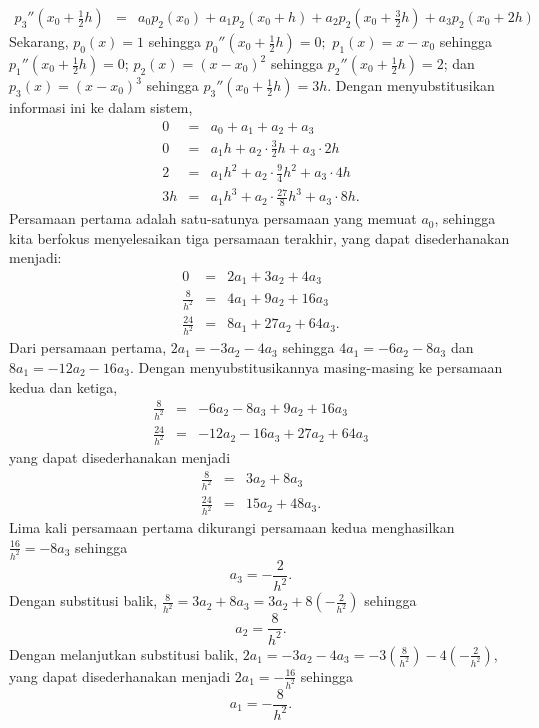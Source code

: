 \begin{description}
\begin{eqnarray*}
p_{3}''\left(x_{0}+\frac{1}{2}h\right) & = & a_{0}p_{2}(x_{0})+a_{1}p_{2}(x_{0}+h)+a_{2}p_{2}(x_{0}+\frac{3}{2}h)+a_{3}p_{2}(x_{0}+2h)
\end{eqnarray*}
Sekarang, $p_{0}(x)=1$ sehingga $p_{0}''(x_{0}+\frac{1}{2}h)=0;$
$p_{1}(x)=x-x_{0}$ sehingga $p_{1}''(x_{0}+\frac{1}{2}h)=0$; $p_{2}(x)=(x-x_{0})^{2}$
sehingga $p_{2}''(x_{0}+\frac{1}{2}h)=2$; dan $p_{3}(x)=(x-x_{0})^{3}$
sehingga $p_{3}''(x_{0}+\frac{1}{2}h)=3h$. Dengan menyubstitusikan
informasi ini ke dalam sistem,
\begin{eqnarray*}
0 & = & a_{0}+a_{1}+a_{2}+a_{3}\\
0 & = & a_{1}h+a_{2}\cdot\frac{3}{2}h+a_{3}\cdot2h\\
2 & = & a_{1}h^{2}+a_{2}\cdot\frac{9}{4}h^{2}+a_{3}\cdot4h\\
3h & = & a_{1}h^{3}+a_{2}\cdot\frac{27}{8}h^{3}+a_{3}\cdot8h.
\end{eqnarray*}
Persamaan pertama adalah satu-satunya persamaan yang memuat $a_{0}$,
sehingga kita berfokus menyelesaikan tiga persamaan terakhir, yang
dapat disederhanakan menjadi:
\begin{eqnarray*}
0 & = & 2a_{1}+3a_{2}+4a_{3}\\
\frac{8}{h^{2}} & = & 4a_{1}+9a_{2}+16a_{3}\\
\frac{24}{h^{2}} & = & 8a_{1}+27a_{2}+64a_{3}.
\end{eqnarray*}
Dari persamaan pertama, $2a_{1}=-3a_{2}-4a_{3}$ sehingga $4a_{1}=-6a_{2}-8a_{3}$
dan $8a_{1}=-12a_{2}-16a_{3}$. Dengan menyubstitusikannya masing-masing
ke persamaan kedua dan ketiga,
\begin{eqnarray*}
\frac{8}{h^{2}} & = & -6a_{2}-8a_{3}+9a_{2}+16a_{3}\\
\frac{24}{h^{2}} & = & -12a_{2}-16a_{3}+27a_{2}+64a_{3}
\end{eqnarray*}
yang dapat disederhanakan menjadi
\begin{eqnarray*}
\frac{8}{h^{2}} & = & 3a_{2}+8a_{3}\\
\frac{24}{h^{2}} & = & 15a_{2}+48a_{3}.
\end{eqnarray*}
Lima kali persamaan pertama dikurangi persamaan kedua menghasilkan
$\frac{16}{h^{2}}=-8a_{3}$ sehingga 
\[
a_{3}=-\frac{2}{h^{2}}.
\]
Dengan substitusi balik, $\frac{8}{h^{2}}=3a_{2}+8a_{3}=3a_{2}+8(-\frac{2}{h^{2}})$
sehingga
\[
a_{2}=\frac{8}{h^{2}}.
\]
Dengan melanjutkan substitusi balik, $2a_{1}=-3a_{2}-4a_{3}=-3(\frac{8}{h^{2}})-4(-\frac{2}{h^{2}})$,
yang dapat disederhanakan menjadi $2a_{1}=-\frac{16}{h^{2}}$ sehingga
\[
a_{1}=-\frac{8}{h^{2}}.
\]
\end{description}
